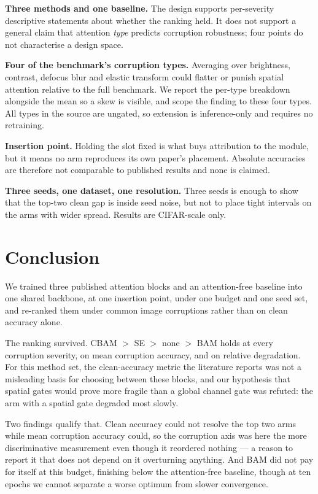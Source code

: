 \documentclass[10pt]{article}
\begin{document}
\textbf{Three methods and one baseline.} The design supports per-severity
descriptive statements about whether the ranking held. It does not support a
general claim that attention \emph{type} predicts corruption robustness; four
points do not characterise a design space.

\textbf{Four of the benchmark's corruption types.} Averaging over brightness,
contrast, defocus blur and elastic transform could flatter or punish spatial
attention relative to the full benchmark. We report the per-type breakdown
alongside the mean so a skew is visible, and scope the finding to these four
types. All types in the source are ungated, so extension is inference-only and
requires no retraining.

\textbf{Insertion point.} Holding the slot fixed is what buys attribution to the
module, but it means no arm reproduces its own paper's placement. Absolute
accuracies are therefore not comparable to published results and none is
claimed.

\textbf{Three seeds, one dataset, one resolution.} Three seeds is enough to show
that the top-two clean gap is inside seed noise, but not to place tight
intervals on the arms with wider spread. Results are CIFAR-scale only.

\section{Conclusion}
\label{sec:conclusion}

We trained three published attention blocks and an attention-free baseline into
one shared backbone, at one insertion point, under one budget and one seed set,
and re-ranked them under common image corruptions rather than on clean accuracy
alone.

The ranking survived. CBAM $>$ SE $>$ none $>$ BAM holds at every corruption
severity, on mean corruption accuracy, and on relative degradation. For this
method set, the clean-accuracy metric the literature reports was not a
misleading basis for choosing between these blocks, and our hypothesis that
spatial gates would prove more fragile than a global channel gate was refuted:
the arm with a spatial gate degraded most slowly.

Two findings qualify that. Clean accuracy could not resolve the top two arms
while mean corruption accuracy could, so the corruption axis was here the more
discriminative measurement even though it reordered nothing --- a reason to
report it that does not depend on it overturning anything. And BAM did not pay
for itself at this budget, finishing below the attention-free baseline, though
at ten epochs we cannot separate a worse optimum from slower convergence.
\end{document}
